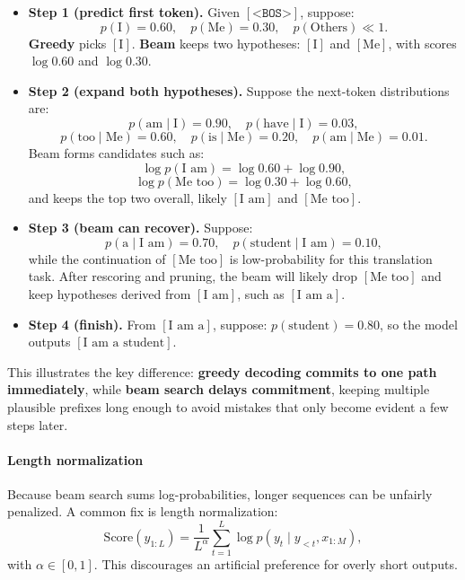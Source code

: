 \begin{itemize}
	\item \textbf{Step 1 (predict first token).}
	Given \([\texttt{<BOS>}]\), suppose:
	\[
	p(\text{I})=0.60,
	\quad
	p(\text{Me})=0.30,
	\quad
	p(\text{Others}) \ll 1.
	\]
	\textbf{Greedy} picks \([\text{I}]\).
	\textbf{Beam} keeps two hypotheses:
	\([\text{I}]\) and \([\text{Me}]\),
	with scores
	\(\log 0.60\) and \(\log 0.30\).
	
	\item \textbf{Step 2 (expand both hypotheses).}
	Suppose the next-token distributions are:
	\[
	p(\text{am}\mid \text{I})=0.90,
	\quad
	p(\text{have}\mid \text{I})=0.03,
	\]
	\[
	p(\text{too}\mid \text{Me})=0.60,
	\quad
	p(\text{is}\mid \text{Me})=0.20,
	\quad
	p(\text{am}\mid \text{Me})=0.01.
	\]
	Beam forms candidates such as:
	\[
	\log p(\text{I am})
	=
	\log 0.60 + \log 0.90,
	\]
	\[
	\log p(\text{Me too})
	=
	\log 0.30 + \log 0.60,
	\]
	and keeps the top two overall,
	likely \([\text{I am}]\) and \([\text{Me too}]\).
	
	\item \textbf{Step 3 (beam can recover).}
	Suppose:
	\[
	p(\text{a}\mid \text{I am})=0.70,
	\quad
	p(\text{student}\mid \text{I am})=0.10,
	\]
	while the continuation of \([\text{Me too}]\) is low-probability
	for this translation task.
	After rescoring and pruning,
	the beam will likely drop \([\text{Me too}]\)
	and keep hypotheses derived from \([\text{I am}]\),
	such as \([\text{I am a}]\).
	
	\item \textbf{Step 4 (finish).}
	From \([\text{I am a}]\), suppose:
	\(
	p(\text{student})=0.80
	\),
	so the model outputs \([\text{I am a student}]\).
\end{itemize}

\noindent
This illustrates the key difference:
\textbf{greedy decoding commits to one path immediately},
while
\textbf{beam search delays commitment},
keeping multiple plausible prefixes long enough
to avoid mistakes that only become evident a few steps later.

\paragraph{Length normalization}
\noindent
Because beam search sums log-probabilities,
longer sequences can be unfairly penalized.
A common fix is length normalization:
\[
\text{Score}(y_{1:L})
=
\frac{1}{L^\alpha}
\sum_{t=1}^{L}
\log p(y_t \mid y_{<t}, x_{1:M}),
\]
with \(\alpha \in [0,1]\).
This discourages an artificial preference for overly short outputs.

